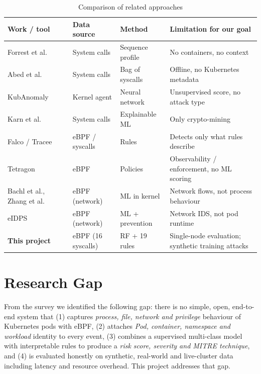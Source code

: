 \begin{table}[H]
\centering
\caption{Comparison of related approaches}
\label{tab:litcompare}
\small
\begin{tabularx}{\textwidth}{>{\raggedright\arraybackslash}p{2.6cm} >{\raggedright\arraybackslash}p{1.9cm} >{\raggedright\arraybackslash}p{2.1cm} >{\raggedright\arraybackslash}X}
\toprule
\textbf{Work / tool} & \textbf{Data source} & \textbf{Method} & \textbf{Limitation for our goal} \\
\midrule
Forrest et al.~\cite{forrest1996} & System calls & Sequence profile & No containers, no context \\
Abed et al.~\cite{abed2015} & System calls & Bag of syscalls & Offline, no Kubernetes metadata \\
KubAnomaly~\cite{tien2019} & Kernel agent & Neural network & Unsupervised score, no attack type \\
Karn et al.~\cite{karn2021} & System calls & Explainable ML & Only crypto-mining \\
Falco / Tracee~\cite{falco,tracee} & eBPF / syscalls & Rules & Detects only what rules describe \\
Tetragon~\cite{tetragon} & eBPF & Policies & Observability / enforcement, no ML scoring \\
Bachl et al., Zhang et al.~\cite{bachl2021,zhang2024} & eBPF (network) & ML in kernel & Network flows, not process behaviour \\
eIDPS~\cite{kostopoulos2025} & eBPF (network) & ML + prevention & Network IDS, not pod runtime \\
\midrule
\textbf{This project} & eBPF (16 syscalls) & RF + 19 rules & Single-node evaluation; synthetic training attacks \\
\bottomrule
\end{tabularx}
\end{table}

\section{Research Gap}

From the survey we identified the following gap: there is no simple, open,
end-to-end system that (1) captures \emph{process, file, network and privilege}
behaviour of Kubernetes pods with eBPF, (2) attaches \emph{Pod, container, namespace
and workload} identity to every event, (3) combines a supervised multi-class model
with interpretable rules to produce a \emph{risk score, severity and MITRE technique},
and (4) is evaluated honestly on synthetic, real-world and live-cluster data including
latency and resource overhead. This project addresses that gap.
